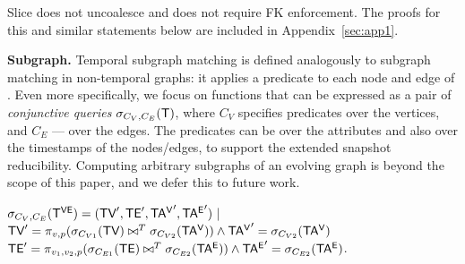 Slice does not uncoalesce and does not require FK enforcement.  The
proofs for this and similar statements below are included in
Appendix~\ref{sec:app1}.


{\bf Subgraph.}  Temporal subgraph matching is defined analogously to
subgraph matching in non-temporal graphs: it applies a predicate to
each node and edge of \tg.   Even more specifically, we focus on functions
that can be expressed as a pair of {\em conjunctive queries}
$\sigma_{C_V,C_E} (\mathsf{T})$, where $C_V$ specifies predicates over the
vertices, and $C_E$ --- over the edges.  The predicates can be over
the attributes and also over the timestamps of the nodes/edges, to
support the extended snapshot reducibility.  Computing arbitrary
subgraphs of an evolving graph is beyond the scope of this paper, and
we defer this to future work.

$\sigma_{C_V,C_E} (\mathsf{T^{VE}}) = (\textsf{TV}',\textsf{TE}',\mathsf{TA^{V}}',\mathsf{TA^{E}}') ~|~$ \\
$\textsf{TV}' = \pi_{v,p} (\sigma_{C_{V1}} (\textsf{TV}) \bowtie^T \sigma_{C_{V2}} (\mathsf{TA^{V}})) \wedge \mathsf{TA^{V}}' = \sigma_{C_{V2}} (\mathsf{TA^{V}})$ \\
$\textsf{TE}' = \pi_{v_1,v_2,p} (\sigma_{C_{E1}} (\textsf{TE}) \bowtie^T \sigma_{C_{E2}} (\mathsf{TA^{E}})) \wedge \mathsf{TA^{E}}' = \sigma_{C_{E2}} (\mathsf{TA^{E}})$.


